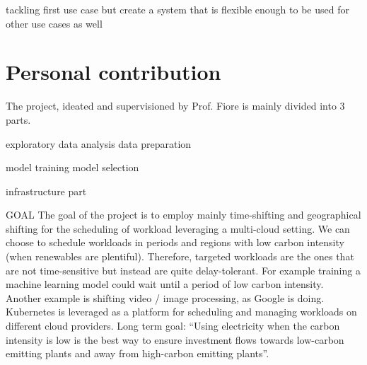 tackling first use case
but create a system that is flexible enough to be used for other use cases as well

\section{Personal contribution}

The project, ideated and supervisioned by Prof. Fiore is mainly divided into 3 parts.

exploratory data analysis
data preparation

model training
model selection

infrastructure part

GOAL
The goal of the project is to employ mainly time-shifting and geographical shifting for the scheduling of workload leveraging a multi-cloud setting.
We can choose to schedule workloads in periods and regions with low carbon intensity (when renewables are plentiful). 
Therefore, targeted workloads are the ones that are not time-sensitive but instead are quite delay-tolerant. For example training a machine learning model could wait until a period of low carbon intensity. Another example is shifting video / image processing, as Google is doing.
Kubernetes is leveraged as a platform for scheduling and managing workloads on different cloud providers.
Long term goal: “Using electricity when the carbon intensity is low is the best way to ensure investment flows towards low-carbon emitting plants and away from high-carbon emitting plants”.

\newpage
